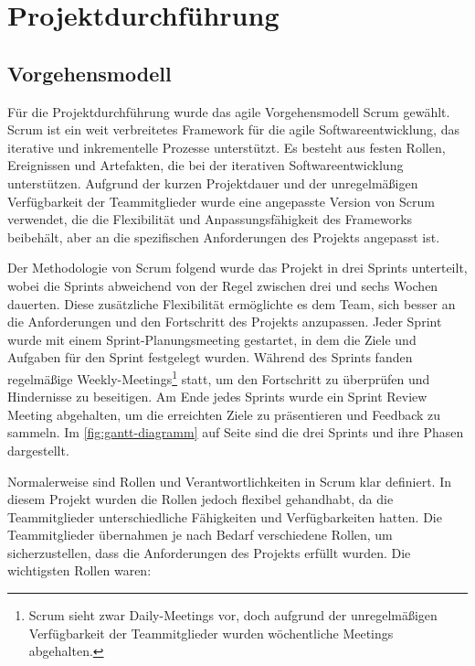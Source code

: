 
\section{Projektdurchführung}\label{projektdurchfuehrung}

\subsection{Vorgehensmodell}\label{vorgehensmodell}

Für die Projektdurchführung wurde das agile Vorgehensmodell \gls{Scrum} gewählt. Scrum ist ein weit verbreitetes Framework für die agile Softwareentwicklung, das iterative und inkrementelle Prozesse unterstützt. Es besteht aus festen Rollen, Ereignissen und Artefakten, die bei der iterativen Softwareentwicklung unterstützen. Aufgrund der kurzen Projektdauer und der unregelmäßigen Verfügbarkeit der Teammitglieder wurde eine angepasste Version von Scrum verwendet, die die Flexibilität und Anpassungsfähigkeit des Frameworks beibehält, aber an die spezifischen Anforderungen des Projekts angepasst ist.

Der Methodologie von Scrum folgend wurde das Projekt in drei Sprints unterteilt, wobei die Sprints abweichend von der Regel zwischen drei und sechs Wochen dauerten. Diese zusätzliche Flexibilität ermöglichte es dem Team, sich besser an die Anforderungen und den Fortschritt des Projekts anzupassen. Jeder Sprint wurde mit einem Sprint-Planungsmeeting gestartet, in dem die Ziele und Aufgaben für den Sprint festgelegt wurden. Während des Sprints fanden regelmäßige Weekly-Meetings\footnote{Scrum sieht zwar Daily-Meetings vor, doch aufgrund der unregelmäßigen Verfügbarkeit der Teammitglieder wurden wöchentliche Meetings abgehalten.} statt, um den Fortschritt zu überprüfen und Hindernisse zu beseitigen. Am Ende jedes Sprints wurde ein Sprint Review Meeting abgehalten, um die erreichten Ziele zu präsentieren und Feedback zu sammeln. Im \ref{fig:gantt-diagramm} auf Seite \pageref{fig:gantt-diagramm} sind die drei Sprints und ihre Phasen dargestellt.

Normalerweise sind Rollen und Verantwortlichkeiten in Scrum klar definiert. In diesem Projekt wurden die Rollen jedoch flexibel gehandhabt, da die Teammitglieder unterschiedliche Fähigkeiten und Verfügbarkeiten hatten. Die Teammitglieder übernahmen je nach Bedarf verschiedene Rollen, um sicherzustellen, dass die Anforderungen des Projekts erfüllt wurden. Die wichtigsten Rollen waren:

